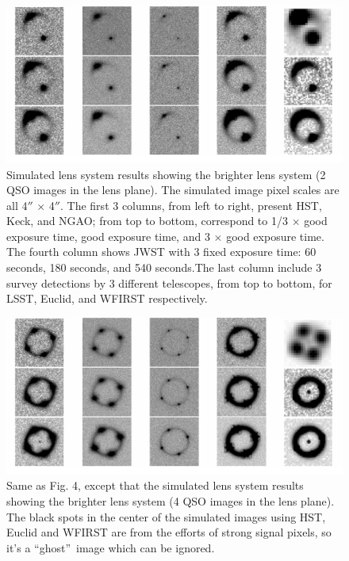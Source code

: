 \documentclass[a4paper,11pt]{article}
\begin{document}
\begin{figure}
\begin{center}
\includegraphics[width=1.0\textwidth]{brighter_system_2QSOimages_all.png}
\end{center}
\caption{Simulated lens system results showing the brighter lens system (2 QSO images in the lens plane). The simulated image pixel scales are all 4$''$ $\times$ 4$''$. The first 3 columns, from left to right, present HST, Keck, and NGAO; from top to bottom, correspond to 1/3 $\times$ good exposure time, good exposure time, and 3 $\times$ good exposure time. The fourth column shows JWST with 3 fixed exposure time: 60 seconds, 180 seconds, and 540 seconds.The last column include 3 survey detections by 3 different telescopes, from top to bottom, for LSST, Euclid, and WFIRST respectively.}
\label{fig:brighter_2QSOimages_montage}
\end{figure}


\begin{figure}
\begin{center}
\includegraphics[width=1.0\textwidth]{brighter_system_4QSOimages_all.png}
\end{center}
\caption{Same as Fig. 4, except that the simulated lens system results showing the brighter lens system (4 QSO images in the lens plane). The black spots in the center of the simulated images using HST, Euclid and WFIRST are from the efforts of strong signal pixels, so it's a \textquotedblleft ghost\textquotedblright\ image which can be ignored.}
\label{fig:brighter_4QSOimages_montage}
\end{figure}
\end{document}
